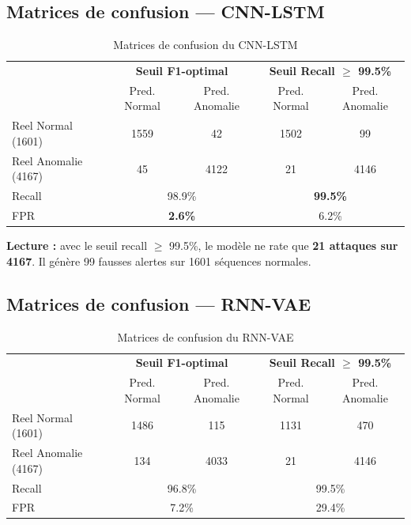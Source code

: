 \documentclass[12pt,a4paper]{article}
\begin{document}
\subsection{Matrices de confusion --- CNN-LSTM}

\begin{table}[H]
\centering
\begin{tabular}{l|cc|cc}
\toprule
& \multicolumn{2}{c|}{\textbf{Seuil F1-optimal}} & \multicolumn{2}{c}{\textbf{Seuil Recall $\geq$ 99.5\%}} \\
& Pred. Normal & Pred. Anomalie & Pred. Normal & Pred. Anomalie \\
\midrule
Reel Normal (1601) & 1559 & 42 & 1502 & 99 \\
Reel Anomalie (4167) & 45 & 4122 & 21 & 4146 \\
\midrule
Recall & \multicolumn{2}{c|}{98.9\%} & \multicolumn{2}{c}{\textbf{99.5\%}} \\
FPR & \multicolumn{2}{c|}{\textbf{2.6\%}} & \multicolumn{2}{c}{6.2\%} \\
\bottomrule
\end{tabular}
\caption{Matrices de confusion du CNN-LSTM}
\end{table}

\textbf{Lecture :} avec le seuil recall $\geq$ 99.5\%, le modèle ne rate que \textbf{21 attaques sur 4167}. Il génère 99 fausses alertes sur 1601 séquences normales.

\subsection{Matrices de confusion --- RNN-VAE}

\begin{table}[H]
\centering
\begin{tabular}{l|cc|cc}
\toprule
& \multicolumn{2}{c|}{\textbf{Seuil F1-optimal}} & \multicolumn{2}{c}{\textbf{Seuil Recall $\geq$ 99.5\%}} \\
& Pred. Normal & Pred. Anomalie & Pred. Normal & Pred. Anomalie \\
\midrule
Reel Normal (1601) & 1486 & 115 & 1131 & 470 \\
Reel Anomalie (4167) & 134 & 4033 & 21 & 4146 \\
\midrule
Recall & \multicolumn{2}{c|}{96.8\%} & \multicolumn{2}{c}{99.5\%} \\
FPR & \multicolumn{2}{c|}{7.2\%} & \multicolumn{2}{c}{29.4\%} \\
\bottomrule
\end{tabular}
\caption{Matrices de confusion du RNN-VAE}
\end{table}
\end{document}

